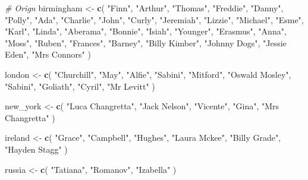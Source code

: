 \documentclass[
]{article}
\newenvironment{Shaded}{\begin{snugshade}}{\end{snugshade}}
\newcommand{\CommentTok}[1]{\textcolor[rgb]{0.56,0.35,0.01}{\textit{#1}}}
\newcommand{\FunctionTok}[1]{\textcolor[rgb]{0.13,0.29,0.53}{\textbf{#1}}}
\newcommand{\NormalTok}[1]{#1}
\newcommand{\OtherTok}[1]{\textcolor[rgb]{0.56,0.35,0.01}{#1}}
\newcommand{\StringTok}[1]{\textcolor[rgb]{0.31,0.60,0.02}{#1}}
\begin{document}
\begin{Shaded}
\begin{Highlighting}[]
\CommentTok{\# Orign}
\NormalTok{birmingham }\OtherTok{\textless{}{-}} \FunctionTok{c}\NormalTok{(}
  \StringTok{"Finn"}\NormalTok{, }\StringTok{"Arthur"}\NormalTok{, }\StringTok{"Thomas"}\NormalTok{, }\StringTok{"Freddie"}\NormalTok{, }\StringTok{"Danny"}\NormalTok{, }\StringTok{"Polly"}\NormalTok{, }\StringTok{"Ada"}\NormalTok{,}
  \StringTok{"Charlie"}\NormalTok{, }\StringTok{"John"}\NormalTok{, }\StringTok{"Curly"}\NormalTok{, }\StringTok{"Jeremiah"}\NormalTok{, }\StringTok{"Lizzie"}\NormalTok{, }\StringTok{"Michael"}\NormalTok{, }\StringTok{"Esme"}\NormalTok{,}
  \StringTok{"Karl"}\NormalTok{, }\StringTok{"Linda"}\NormalTok{, }\StringTok{"Aberama"}\NormalTok{, }\StringTok{"Bonnie"}\NormalTok{, }\StringTok{"Isiah"}\NormalTok{, }\StringTok{"Younger"}\NormalTok{, }\StringTok{"Erasmus"}\NormalTok{,}
  \StringTok{"Anna"}\NormalTok{, }\StringTok{"Moss"}\NormalTok{, }\StringTok{"Ruben"}\NormalTok{, }\StringTok{"Frances"}\NormalTok{, }\StringTok{"Barney"}\NormalTok{, }\StringTok{"Billy Kimber"}\NormalTok{,}
  \StringTok{"Johnny Dogs"}\NormalTok{, }\StringTok{"Jessie Eden"}\NormalTok{, }\StringTok{"Mrs Connors"}
\NormalTok{)}

\NormalTok{london }\OtherTok{\textless{}{-}} \FunctionTok{c}\NormalTok{(}
  \StringTok{"Churchill"}\NormalTok{, }\StringTok{"May"}\NormalTok{, }\StringTok{"Alfie"}\NormalTok{, }\StringTok{"Sabini"}\NormalTok{, }\StringTok{"Mitford"}\NormalTok{, }\StringTok{"Oswald Mosley"}\NormalTok{, }\StringTok{"Sabini"}\NormalTok{,}
  \StringTok{"Goliath"}\NormalTok{, }\StringTok{"Cyril"}\NormalTok{, }\StringTok{"Mr Levitt"}
\NormalTok{)}

\NormalTok{new\_york }\OtherTok{\textless{}{-}} \FunctionTok{c}\NormalTok{(}
  \StringTok{"Luca Changretta"}\NormalTok{, }\StringTok{"Jack Nelson"}\NormalTok{, }\StringTok{"Vicente"}\NormalTok{, }\StringTok{"Gina"}\NormalTok{, }\StringTok{"Mrs Changretta"}
\NormalTok{)}

\NormalTok{ireland }\OtherTok{\textless{}{-}} \FunctionTok{c}\NormalTok{(}
  \StringTok{"Grace"}\NormalTok{, }\StringTok{"Campbell"}\NormalTok{, }\StringTok{"Hughes"}\NormalTok{, }\StringTok{"Laura Mckee"}\NormalTok{, }\StringTok{"Billy Grade"}\NormalTok{, }\StringTok{"Hayden Stagg"}
\NormalTok{)}

\NormalTok{russia }\OtherTok{\textless{}{-}} \FunctionTok{c}\NormalTok{(}
  \StringTok{"Tatiana"}\NormalTok{, }\StringTok{"Romanov"}\NormalTok{, }\StringTok{"Izabella"}
\NormalTok{)}


\end{Highlighting}
\end{Shaded}
\end{document}
